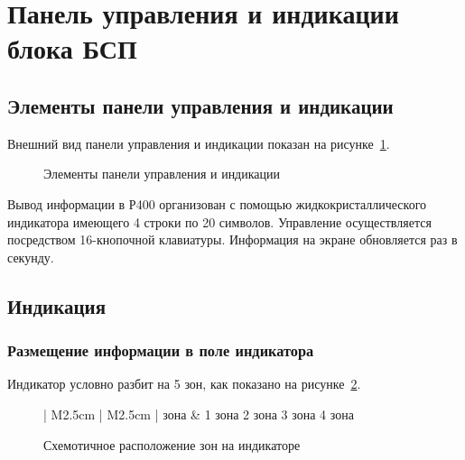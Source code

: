 \section{Панель управления и индикации блока БСП} \label{sec:overview}


\subsection{Элементы панели управления и индикации}

Внешний вид панели управления и индикации показан на рисунке~\ref{fig:pi}.

\begin{figure}[H]
	
	\caption{Элементы панели управления и индикации}
	\label{fig:pi}
\end{figure}

Вывод информации в Р400 организован с помощью жидкокристаллического индикатора имеющего 4 строки по 20 символов. Управление осуществляется посредством 16-кнопочной клавиатуры. Информация на экране обновляется раз в секунду.


\subsection{Индикация} 


\subsubsection{Размещение информации в поле индикатора}

Индикатор условно разбит на 5 зон, как показано на рисунке~\ref{fig:overview_ind}.

\begin{figure}[H]
	\centering
	
	\begin{tabular}{| M{2.5cm} | M{2.5cm} |}	
		 зона	& 1 зона 				\tabularnewline \hline 
	     {2 зона}	\tabularnewline \hline
	     {3 зона}	\tabularnewline \hline
	     {4 зона}	\tabularnewline 
	    \lasthline 
	\end{tabular} 
	
	\caption{Схемотичное расположение зон на индикаторе} 
	\label{fig:overview_ind}
\end{figure}

